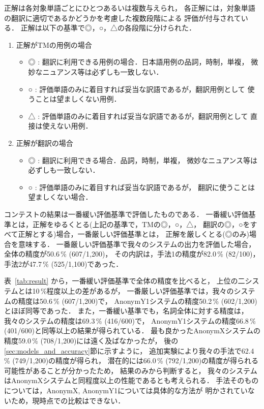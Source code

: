正解は各対象単語ごとにひとつあるいは複数与えられ，
各正解には，対象単語の翻訳に適切であるかどうかを考慮した複数段階による
評価が付与されている．
正解は以下の基準で◎，○，△の各段階に分けられた．
\begin{enumerate}
\item 正解がTMの用例の場合
  \begin{itemize}
  \item ◎ : 翻訳に利用できる用例の場合．日本語用例の品詞，時制，単複，
    微妙なニュアンス等は必ずしも一致しない．
  \item ○ : 評価単語のみに着目すれば妥当な訳語であるが，翻訳用例として
    使うことは望ましくない用例．
  \item △ : 評価単語のみに着目すれば妥当な訳語であるが，翻訳用例として
    直接は使えない用例．
  \end{itemize}
\item 正解が翻訳の場合
  \begin{itemize}
  \item ◎ : 翻訳に利用できる場合．品詞，時制，単複，
    微妙なニュアンス等は必ずしも一致しない．
  \item ○ : 評価単語のみに着目すれば妥当な訳語であるが，
    翻訳に使うことは望ましくない場合．
  \end{itemize}
\end{enumerate}
コンテストの結果は一番緩い評価基準で評価したものである．
一番緩い評価基準とは，正解をゆるくとる(上記の基準で，TMの◎，○，△，
翻訳の◎，○をすべて正解とする)場合，一番厳しい評価基準とは，
正解を厳しくとる(◎のみ)場合を意味する．
一番厳しい評価基準で我々のシステムの出力を評価した場合，
全体の精度が50.6\,\% (607/1,200)，
その内訳は，手法1の精度が82.0\,\% (82/100)，手法2が47.7\,\% (525/1,100)であった．

表~\ref{tab:result} から，一番緩い評価基準で全体の精度を比べると，
上位の二システムとは10\,\%程度以上の差があるが，
一番厳しい評価基準では，我々のシステムの精度は50.6\,\% (607/1,200)で，
AnonymY1システムの精度50.2\,\% (602/1,200)とほぼ同等であった．
また，一番緩い基準でも，名詞全体に対する精度は，
我々のシステムの精度は69.3\,\% (416/600)で，
AnonymY1システムの精度66.8\,\% (401/600)と同等以上の結果が得られている．
最も良かったAnonymXシステムの精度59.0\,\% (708/1,200)には遠く及ばなかったが，
後の\ref{sec:models_and_accuracy}節に示すように，
追加実験により我々の手法で62.4\,\% (749/1,200)の精度が得られ，
潜在的には66.0\,\% (792/1,200)の精度が得られる可能性があることが分かったため，
結果のみから判断すると，
我々のシステムはAnonymXシステムと同程度以上の性能であるとも考えられる．
手法そのものについては，AnonymX, AnonymY1については具体的な方法が
明かされていないため，現時点での比較はできない．

